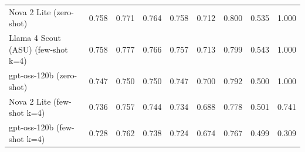 \begin{table}[htbp]
\begin{tabular}{lcccccccc}
Nova 2 Lite (zero-shot) & 0.758 & 0.771 & 0.764 & 0.758 & 0.712 & 0.800 & 0.535 & 1.000 \\
Llama 4 Scout (ASU) (few-shot k=4) & 0.758 & 0.777 & 0.766 & 0.757 & 0.713 & 0.799 & 0.543 & 1.000 \\
gpt-oss-120b (zero-shot) & 0.747 & 0.750 & 0.750 & 0.747 & 0.700 & 0.792 & 0.500 & 1.000 \\
Nova 2 Lite (few-shot k=4) & 0.736 & 0.757 & 0.744 & 0.734 & 0.688 & 0.778 & 0.501 & 0.741 \\
gpt-oss-120b (few-shot k=4) & 0.728 & 0.762 & 0.738 & 0.724 & 0.674 & 0.767 & 0.499 & 0.309 \\
\bottomrule
\end{tabular}
\end{table}